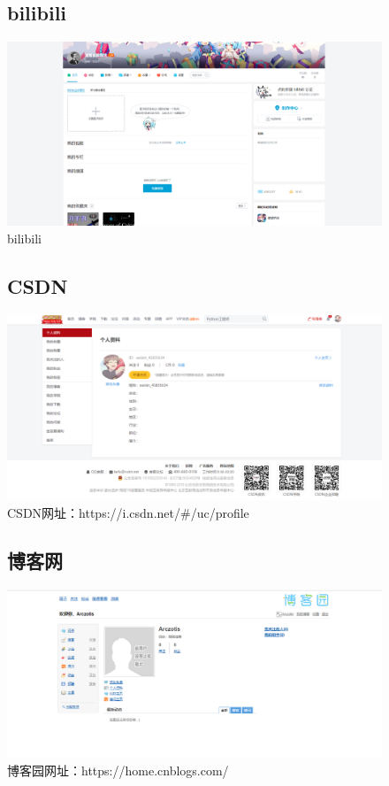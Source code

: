 \documentclass{article}
\begin{document}
\begin{itemize}
\begin{figure}[htb!]
\item\subsection{bilibili}
\centering
\includegraphics[scale=0.25]{bilibili}
\caption{bilibili}
\label{fig:bilibili}
\end{figure}

\begin{figure}[htb!]
\item\subsection{CSDN}
\centering
\includegraphics[scale=0.25]{CSDN}
\caption{CSDN网址：https://i.csdn.net/\#/uc/profile}
\label{fig:CSDN}
\end{figure}

\begin{figure}[htb!]
\item\subsection{博客网}
\centering
\includegraphics[scale=0.25]{bokeyuan}
\caption{博客园网址：https://home.cnblogs.com/}
\label{fig:bokeyuan}
\end{figure}


\end{itemize}
\end{document}
